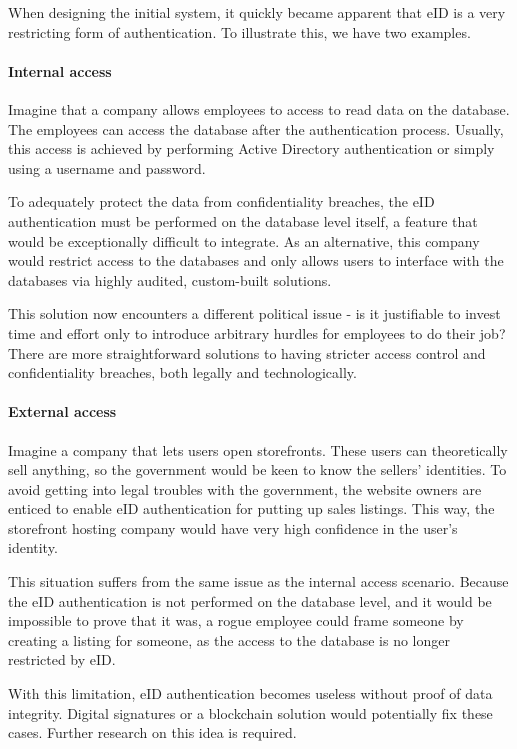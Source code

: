 When designing the initial system, it quickly became apparent that eID is a very restricting form of authentication. To illustrate this, we have two examples.

\paragraph{Internal access} Imagine that a company allows employees to access to read data on the database. The employees can access the database after the authentication process. Usually, this access is achieved by performing Active Directory authentication or simply using a username and password.

To adequately protect the data from confidentiality breaches, the eID authentication must be performed on the database level itself, a feature that would be exceptionally difficult to integrate. As an alternative, this company would restrict access to the databases and only allows users to interface with the databases via highly audited, custom-built solutions.

This solution now encounters a different political issue - is it justifiable to invest time and effort only to introduce arbitrary hurdles for employees to do their job? There are more straightforward solutions to having stricter access control and confidentiality breaches, both legally and technologically.

\paragraph{External access}

Imagine a company that lets users open storefronts. These users can theoretically sell anything, so the government would be keen to know the sellers' identities. To avoid getting into legal troubles with the government, the website owners are enticed to enable eID authentication for putting up sales listings. This way, the storefront hosting company would have very high confidence in the user's identity.

This situation suffers from the same issue as the internal access scenario. Because the eID authentication is not performed on the database level, and it would be impossible to prove that it was, a rogue employee could frame someone by creating a listing for someone, as the access to the database is no longer restricted by eID.

With this limitation, eID authentication becomes useless without proof of data integrity. Digital signatures or a blockchain solution would potentially fix these cases. Further research on this idea is required.

